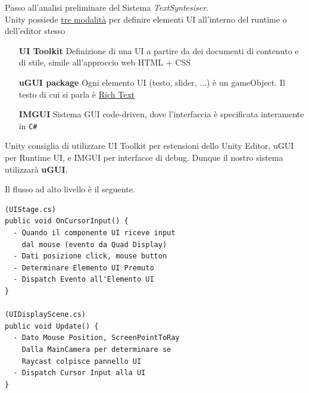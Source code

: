 \documentclass[10pt, openany]{article}
\begin{document}
  \FloatBarrier
  Passo all'analisi preliminare del Sistema \textit{TextSyntesiser}.\\
  Unity possiede \href{https://docs.unity3d.com/6000.0/Documentation/Manual/UIToolkits.html}{tre modalit\`a} per definire elementi UI all'interno del runtime o dell'editor stesso
  \begin{itemize}[leftmargin=33mm, topsep=0pt, noitemsep]
    \item[\textbf{UI Toolkit}] Definizione di una UI a partire da dei documenti di contenuto e di stile, simile all'approccio web HTML + CSS
    \item[\textbf{uGUI package}] Ogni elemento UI (testo, slider, ...) \`e un gameObject. Il testo di cui si parla \`e 
      \href{https://docs.unity3d.com/Packages/com.unity.ugui@2.0/manual/TextMeshPro/RichTextSupportedTags.html}{Rich Text}
    \item[\textbf{IMGUI}] Sistema GUI code-driven, dove l'interfaccia \`e specificata interamente in \texttt{C\#}
  \end{itemize}
  Unity consiglia di utilizzare UI Toolkit per estensioni dello Unity Editor, uGUI per Runtime UI, e IMGUI per interfacce di debug. Dunque il nostro sistema utilizzar\`a \textbf{uGUI}.\par
  Il flusso ad alto livello \`e il seguente.\\
  \begin{minipage}[t]{0.48\textwidth}
    \vspace{0pt}
    \begin{adjustbox}{left, outer, frame=1pt 2pt, max width=\textwidth}\begin{lstlisting}[style=sharpc]
(UIStage.cs)
public void OnCursorInput() {
  - Quando il componente UI riceve input 
    dal mouse (evento da Quad Display)
  - Dati posizione click, mouse button
  - Determinare Elemento UI Premuto
  - Dispatch Evento all'Elemento UI
}

(UIDisplayScene.cs)
public void Update() {
  - Dato Mouse Position, ScreenPointToRay 
    Dalla MainCamera per determinare se 
    Raycast colpisce pannello UI
  - Dispatch Cursor Input alla UI
}
    \end{lstlisting}\end{adjustbox}
  \end{minipage}
\end{document}
